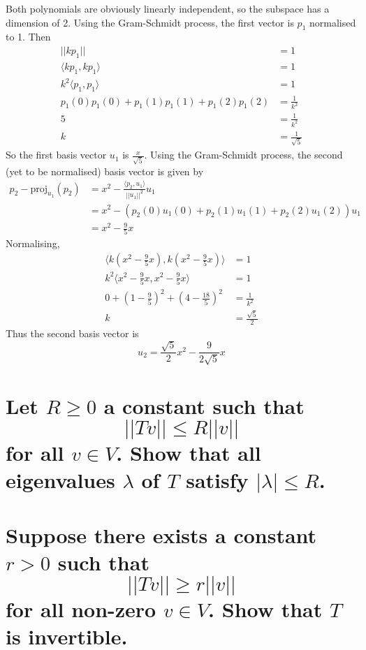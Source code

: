 \documentclass[answers]{exam}
\begin{document}
\begin{questions}
\begin{solution}
	Both polynomials are obviously linearly independent, so the subspace has a dimension of 2. Using the Gram-Schmidt process, the first vector is $p_1$ normalised to 1. Then
	\begin{align*}
		||kp_1|| &= 1 \\
		\langle kp_1,kp_1 \rangle &= 1 \\
		k^2\langle p_1,p_1 \rangle &= 1 \\
		p_1(0)p_1(0) + p_1(1)p_1(1) + p_1(2)p_1(2) &= \frac{1}{k^2} \\
		5 &= \frac{1}{k^2} \\
		k &= \frac{1}{\sqrt{5}}
	\end{align*}
	So the first basis vector $u_1$ is $\frac{x}{\sqrt{5}}$. Using the Gram-Schmidt process, the second (yet to be normalised) basis vector is given by
	\begin{align*}
		p_2 - \text{proj}_{u_1}(p_2) &= x^2 - \frac{\langle p_2,u_1 \rangle}{||u_1||^2}u_1 \\
					     &= x^2 - (p_2(0)u_1(0) + p_2(1)u_1(1) + p_2(2)u_1(2))u_1 \\
					     &= x^2 - \frac{9}{5}x
	\end{align*}
	Normalising,
	\begin{align*}
		\langle k(x^2 - \frac{9}{5}x),k(x^2 - \frac{9}{5}x) \rangle &= 1 \\
		k^2 \langle x^2 - \frac{9}{5}x,x^2 - \frac{9}{5}x \rangle &= 1 \\
		0 + (1-\frac{9}{5})^2 + (4 - \frac{18}{5})^2 &= \frac{1}{k^2} \\
		k &= \frac{\sqrt{5}}{2}
	\end{align*}
	Thus the second basis vector is
	$$u_2 = \frac{\sqrt{5}}{2}x^2 - \frac{9}{2\sqrt{5}}x$$
\end{solution}


\begin{parts}
	\part{Let $R \geq 0$ a constant such that
		$$||Tv|| \leq R||v||$$
	for all $v \in V$. Show that all eigenvalues $\lambda$ of $T$ satisfy $|\lambda| \leq R$.}
	\part{Suppose there exists a constant $r>0$ such that
		$$||Tv|| \geq r||v||$$
	for all non-zero $v \in V$. Show that $T$ is invertible.}
\end{parts}


\end{questions}
\end{document}
